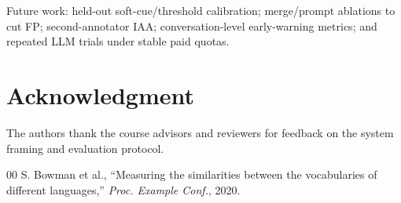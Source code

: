\documentclass[conference]{IEEEtran}
\begin{document}
Future work: held-out soft-cue/threshold calibration; merge/prompt ablations to
cut FP; second-annotator IAA; conversation-level early-warning metrics; and
repeated LLM trials under stable paid quotas.

\section*{Acknowledgment}
The authors thank the course advisors and reviewers for feedback on the system
framing and evaluation protocol.

\begin{thebibliography}{00}
 S. Bowman et al., ``Measuring the similarities between the
vocabularies of different languages,'' \textit{Proc. Example Conf.}, 2020.
\end{thebibliography}
\end{document}
